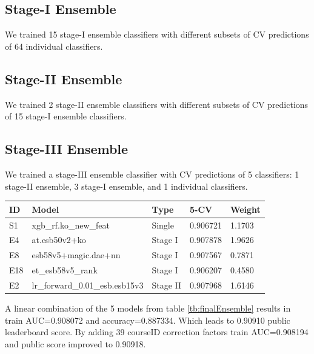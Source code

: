 \subsection{Stage-I Ensemble}
We trained 15 stage-I ensemble classifiers with different subsets of CV predictions of 64 individual classifiers.

\subsection{Stage-II Ensemble}
We trained 2 stage-II ensemble classifiers with different subsets of CV predictions of 15 stage-I ensemble classifiers.

\subsection{Stage-III Ensemble}
We trained a stage-III ensemble classifier with CV predictions of 5 classifiers: 1 stage-II ensemble, 3 stage-I ensemble, and 1 individual classifiers.
\\

\begin{center}
\begin{tabular}{lllll}
\label{tb:finalEnsemble}
ID 	& Model 				& Type 	& 5-CV 		& Weight\\ \hline
S1 	& xgb\_rf.ko\_new\_feat 	& Single 	& 0.906721 	& 1.1703 \\
E4 	& at.esb50v2+ko 		& Stage I 	& 0.907878 	& 1.9626\\
E8 	& esb58v5+magic.dae+nn & Stage I & 0.907567	& 0.7871\\
E18	& et\_esb58v5\_rank		& Stage I	& 0.906207 	& 0.4580\\
E2	& lr\_forward\_0.01\_esb.esb15v3 & Stage II & 0.907968 & 1.6146\\
\end{tabular}
\end{center}

A linear combination of the 5 models from table \ref{tb:finalEnsemble} results in train AUC=0.908072 and accuracy=0.887334.
Which leads to 0.90910 public leaderboard score.
By adding 39 courseID correction factors train AUC=0.908194 and public score improved to 0.90918.


